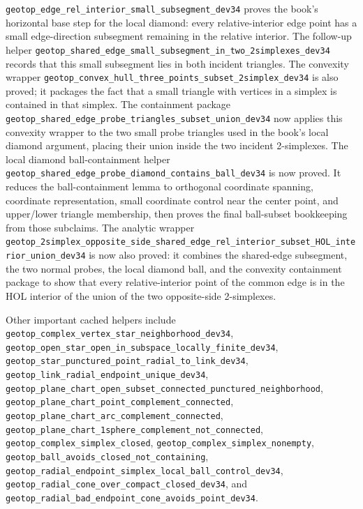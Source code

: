 \documentclass{article}
\begin{document}
\texttt{geotop\_edge\_rel\_interior\_small\_subsegment\_dev34} proves the
book's horizontal base step for the local diamond: every relative-interior edge
point has a small edge-direction subsegment remaining in the relative interior.
The follow-up helper
\texttt{geotop\_shared\_edge\_small\_subsegment\_in\_two\_2simplexes\_dev34}
records that this small subsegment lies in both incident triangles.
The convexity wrapper
\texttt{geotop\_convex\_hull\_three\_points\_subset\_2simplex\_dev34} is also
proved; it packages the fact that a small triangle with vertices in a simplex
is contained in that simplex. The containment package
\texttt{geotop\_shared\_edge\_probe\_triangles\_subset\_union\_dev34} now
applies this convexity wrapper to the two small probe triangles used in the
book's local diamond argument, placing their union inside the two incident
2-simplexes. The local diamond ball-containment helper
\texttt{geotop\_shared\_edge\_probe\_diamond\_contains\_ball\_dev34} is now
proved. It reduces the ball-containment lemma to orthogonal coordinate
spanning, coordinate representation, small coordinate control near the center
point, and upper/lower triangle membership, then proves the final ball-subset
bookkeeping from those subclaims. The analytic wrapper
\texttt{geotop\_2simplex\_opposite\_side\_shared\_edge\_rel\_interior\_subset\_HOL\_interior\_union\_dev34}
is now also proved: it combines the shared-edge subsegment, the two normal
probes, the local diamond ball, and the convexity containment package to show
that every relative-interior point of the common edge is in the HOL interior of
the union of the two opposite-side 2-simplexes.

Other important cached helpers include
\texttt{geotop\_complex\_vertex\_star\_neighborhood\_dev34},
\texttt{geotop\_open\_star\_open\_in\_subspace\_locally\_finite\_dev34},
\texttt{geotop\_star\_punctured\_point\_radial\_to\_link\_dev34},
\texttt{geotop\_link\_radial\_endpoint\_unique\_dev34},
\texttt{geotop\_plane\_chart\_open\_subset\_connected\_punctured\_neighborhood},
\texttt{geotop\_plane\_chart\_point\_complement\_connected},
\texttt{geotop\_plane\_chart\_arc\_complement\_connected},
\texttt{geotop\_plane\_chart\_1sphere\_complement\_not\_connected},
\texttt{geotop\_complex\_simplex\_closed},
\texttt{geotop\_complex\_simplex\_nonempty},
\texttt{geotop\_ball\_avoids\_closed\_not\_containing},
\texttt{geotop\_radial\_endpoint\_simplex\_local\_ball\_control\_dev34},
\texttt{geotop\_radial\_cone\_over\_compact\_closed\_dev34}, and
\texttt{geotop\_radial\_bad\_endpoint\_cone\_avoids\_point\_dev34}.
\end{document}
